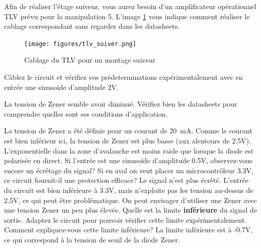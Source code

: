 \documentclass{../template/labo}
\begin{document}
\begin{manip}
Afin de réaliser l'étage suiveur, vous aurez besoin d'un amplificateur opérationnel TLV prévu pour la manipulation 5. L'image \ref{fig:tlv_suiveur} vous indique comment réaliser le cablage correspondant sans regarder dans les datasheets.
\begin{figure}[h!]
	\begin{center}
		\texttt{[image: figures/tlv\_suiver.png]}
	\end{center}
	\caption{Cablage du TLV pour un montage suiveur}
	\label{fig:tlv_suiveur}
\end{figure}

\Question
{Câblez le circuit et vérifiez vos prédeterminations expérimentalement avec en entrée une sinusoide d'amplitude 2V. 
\begin{astuce}
	La tension de Zener semble avoir diminué.
	Vérifiez bien les datasheets pour comprendre quelles sont ses conditions d'application.
\end{astuce}
}
{La tension de Zener a été définie pour un courant de 20~mA. Comme le courant est bien inférieur ici, la tension de Zener est plus basse (aux alentours de 2.5V). L'exponentielle dans la zone d'avalanche est moins raide que lorsque la diode est polarisée en direct. }
\label{Q:zener_4}
\Question
{Si l'entrée est une sinusoïde d'amplitude 0.5V, observez-vous encore un écrêtage du signal? Si en aval on veut placer un microcontrôleur 3.3V, ce circuit fournit-il une protection efficace? }
{Le signal n'est plus écrêté. L'entrée du circuit est bien inférieure à 3.3V, mais n'exploite pas les tension au-dessus de 2.5V, ce qui peut être problématique. On peut envisager d'utiliser une Zener avec une tension Zener un peu plus élevée.
}
\label{Q:zener_4}
\Question
{Quelle est la limite {\bf inférieure} du signal de sortie. Adaptez le circuit pour pouvoir vérifier cette limite expérimentalement. Comment expliquez-vous cette limite inférieure? }
{La limite inférieure est à -0.7V, ce qui correspond à la tension de seuil de la diode Zener. }
\label{Q:zener_5}

\end{manip}
\end{document}
